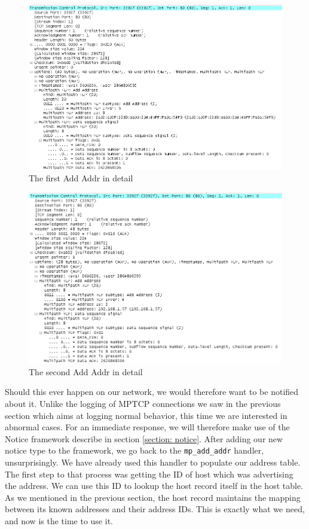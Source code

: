 \begin{figure}[!t]
\centering
\includegraphics[scale = 0.75, angle = 90]{Figures/addaddr1.png}
\caption{The first Add Addr in detail}
\label{pic:2 adds detail1}
\end{figure}

\begin{figure}[!t]
\centering
\includegraphics[scale = 0.75, angle = 90]{Figures/addaddr2.png}
\caption{The second Add Addr in detail}
\label{pic:2 adds detail2}
\end{figure}



Should this ever happen on our network, we would therefore want to be notified about it. Unlike the logging of MPTCP connections we saw in the previous section which aims at logging normal behavior, this time we are interested in abnormal cases. For an immediate response, we will therefore make use of the Notice framework describe in section \ref{section: notice}. After adding our new notice type to the framework, we go back to the \texttt{mp\_add\_addr} handler, unsurprisingly. We have already used this handler to populate our address table. The first step to that process was getting the ID of host which was advertising the address. We can use this ID to lookup the host record itself in the host table. As we mentioned in the previous section, the host record maintains the mapping between its known addresses and their address IDs. This is exactly what we need, and now is the time to use it. \\

